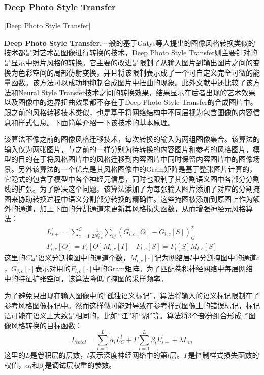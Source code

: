 
\subsubsection{Deep Photo Style Transfer}[Deep Photo Style Transfer]

\textbf{Deep Photo Style Transfer.}\cite{dpst}\quad  一般的基于Gatys等人提出的图像风格转换类似的技术都是对艺术品图像进行转换的技术，Deep Photo Style Transfer则主要针对的是显示中照片风格的转换。它主要的改进是限制了从输入图片到输出图片之间的变换为色彩空间的局部仿射变换，并且将该限制表示成了一个可自定义完全可微的能量函数。该方法可以成功地抑制合成图片中扭曲的现象。此外文献\cite{dpst}中还比较了该方法和Neural Style Transfer技术之间的转换效果，结果显示在后者出现的艺术效果以及图像中的边界扭曲效果都不存在于Deep Photo Style Transfer的合成图片中。跟之前的风格转移技术类似，也是基于将网络结构中不同层视为包含图像的内容信息和样式信息。下面简单介绍一下该技术的基本原理。

该算法不像之前的图像风格迁移技术，每次转换的输入为两组图像集合。该算法的输入仅为两张图片，与之前的一样分别为待转换的内容图片和参考的风格图片，模型的目的在于将风格图片中的风格迁移到内容图片中同时保留内容图片中的图像场景。另外该算法的一个优点是其风格图像中的Gram矩阵是基于整张图片计算的，它隐式的包含了模型中各个神经元信息，同时也限制了其分割语义图中各部分分割线的扩张。为了解决这个问题，该算法添加了为每张输入图片添加了对应的分割掩图来协助转换过程中语义分割部分转换的精确性。这些掩图被添加到原图上作为额外的通道，加上下面的分割通道来更新其风格损失函数，从而增强神经元风格算法：
\begin{gather*}
L_{s+}^l=\sum_{c=1}^C \frac{1}{2N_{l,c}^2}\sum_{ij}(G_{l,c}[O]-G_{l,c}[S])_{ij}^2\\
F_{l,c}[O]=F_l[O]M_{l,c}[I]\quad F_{l,c}[S]=F_l[S]M_{l,c}[S]
\end{gather*}
这里的$C$是语义分割掩图中的通道个数，$M_{l,c}[\cdot]$记为网络层$l$中分割掩图中的通道$c$，$G_{j,c}[\cdot]$表示对用的$F_{l,c}[\cdot]$中的Gram矩阵。为了匹配卷积神经网络中每层网络中的特征扩张空间，该算法降低了掩图的采样频率。

为了避免只出现在输入图像中的“孤独语义标记”，算法将输入的语义标记限制在了参考风格图像标记中。然而这样做可能对导致在参考样式图像上的错误标记，标记语可能在语义上大致是相同的，比如“江”和“湖”等。算法将3个部分组合形成了图像风格转换的目标函数：
$$L_{total}=\sum_{t=1}^L\alpha_lL_C^l+\Gamma\sum_{l=1}^L \beta_lL_{s+}^l +\lambda L_m$$
这里的$L$是卷积层的层数，$l$表示深度神经网络中的第$l$层。$\Gamma$是控制样式损失函数的权值，$\alpha_l$和$\beta_l$是调试层权重的参数。

